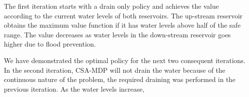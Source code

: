 The first iteration starts with a drain only policy and achieves the value according to the current water levels of both reservoirs. The up-stream reservoir obtains the maximum value function if it has water levels above half of the safe range. The value decreases as water levels in the down-stream reservoir goes higher due to flood prevention. 

We have demonstrated the optimal policy for the next two consequent iterations. In the second iteration, CSA-MDP will not drain the water because of the continuous nature of the problem, the required draining was performed in the previous iteration. As the water levels increase, 


 
%
%
%
